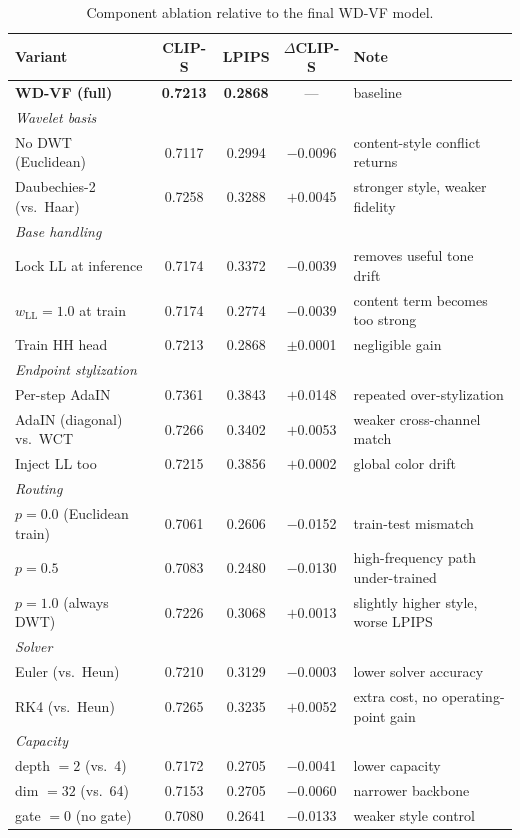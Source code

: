 \documentclass[10pt,letterpaper]{article}
\begin{document}
\begin{table}[h]
\centering
\caption{Component ablation relative to the final WD-VF model.}
\label{tab:ablation_supp}
\small
\setlength{\tabcolsep}{4pt}
\begin{tabular}{@{}lcccl@{}}
\toprule
Variant & CLIP-S & LPIPS & $\Delta$CLIP-S & Note \\
\midrule
\textbf{WD-VF (full)} & \textbf{0.7213} & \textbf{0.2868} & --- & baseline \\
\midrule
\multicolumn{5}{l}{\emph{Wavelet basis}} \\
\quad No DWT (Euclidean) & 0.7117 & 0.2994 & $-$0.0096 & content-style conflict returns \\
\quad Daubechies-2 (vs.\ Haar) & 0.7258 & 0.3288 & $+$0.0045 & stronger style, weaker fidelity \\
\midrule
\multicolumn{5}{l}{\emph{Base handling}} \\
\quad Lock LL at inference & 0.7174 & 0.3372 & $-$0.0039 & removes useful tone drift \\
\quad $w_{\text{LL}}=1.0$ at train & 0.7174 & 0.2774 & $-$0.0039 & content term becomes too strong \\
\quad Train HH head & 0.7213 & 0.2868 & $\pm$0.0001 & negligible gain \\
\midrule
\multicolumn{5}{l}{\emph{Endpoint stylization}} \\
\quad Per-step AdaIN & 0.7361 & 0.3843 & $+$0.0148 & repeated over-stylization \\
\quad AdaIN (diagonal) vs.\ WCT & 0.7266 & 0.3402 & $+$0.0053 & weaker cross-channel match \\
\quad Inject LL too & 0.7215 & 0.3856 & $+$0.0002 & global color drift \\
\midrule
\multicolumn{5}{l}{\emph{Routing}} \\
\quad $p=0.0$ (Euclidean train) & 0.7061 & 0.2606 & $-$0.0152 & train-test mismatch \\
\quad $p=0.5$ & 0.7083 & 0.2480 & $-$0.0130 & high-frequency path under-trained \\
\quad $p=1.0$ (always DWT) & 0.7226 & 0.3068 & $+$0.0013 & slightly higher style, worse LPIPS \\
\midrule
\multicolumn{5}{l}{\emph{Solver}} \\
\quad Euler (vs.\ Heun) & 0.7210 & 0.3129 & $-$0.0003 & lower solver accuracy \\
\quad RK4 (vs.\ Heun) & 0.7265 & 0.3235 & $+$0.0052 & extra cost, no operating-point gain \\
\midrule
\multicolumn{5}{l}{\emph{Capacity}} \\
\quad depth $=2$ (vs.\ 4) & 0.7172 & 0.2705 & $-$0.0041 & lower capacity \\
\quad dim $=32$ (vs.\ 64) & 0.7153 & 0.2705 & $-$0.0060 & narrower backbone \\
\quad gate $=0$ (no gate) & 0.7080 & 0.2641 & $-$0.0133 & weaker style control \\
\bottomrule
\end{tabular}
\end{table}
\end{document}
